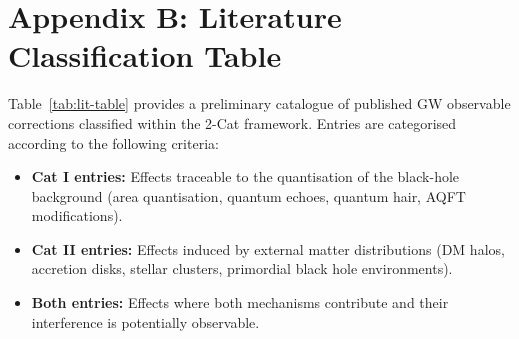 \documentclass[11pt]{article}
\begin{document}
\section{Appendix B: Literature Classification Table}

\label{app:lit-table}

Table~\ref{tab:lit-table} provides a preliminary catalogue of published GW observable corrections classified within the 2-Cat framework. Entries are categorised according to the following criteria:

\begin{itemize}
\item \textbf{Cat I entries:} Effects traceable to the quantisation of the black-hole background (area quantisation, quantum echoes, quantum hair, AQFT modifications).
\item \textbf{Cat II entries:} Effects induced by external matter distributions (DM halos, accretion disks, stellar clusters, primordial black hole environments).
\item \textbf{Both entries:} Effects where both mechanisms contribute and their interference is potentially observable.
\end{itemize}
\end{document}
